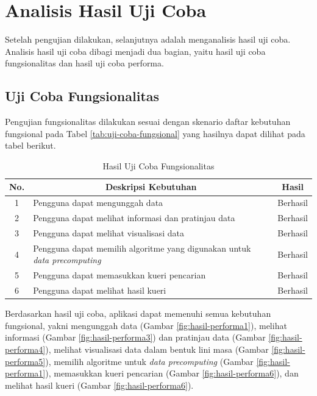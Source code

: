 \section{Analisis Hasil Uji Coba}
\tab Setelah pengujian dilakukan, selanjutnya adalah menganalisis hasil uji coba. Analisis hasil uji coba dibagi menjadi dua bagian, yaitu hasil uji coba fungsionalitas dan hasil uji coba performa.

\subsection{Uji Coba Fungsionalitas}
\tab Pengujian fungsionalitas dilakukan sesuai dengan skenario daftar kebutuhan fungsional pada Tabel \ref{tab:uji-coba-fungsional} yang hasilnya dapat dilihat pada tabel berikut. 

\begin{table}[H]
	\centering
	\begin{tabular}{ | c | p{5cm} | p{2cm} | }
		\hline
		\multicolumn{1}{|c}{\textbf{No.}} & \multicolumn{1}{|c}{\textbf{Deskripsi Kebutuhan}} & \multicolumn{1}{|c|}{\textbf{Hasil}}\\ \hline \hline
		1 & Pengguna dapat mengunggah data & Berhasil\\ \hline
		2 & Pengguna dapat melihat informasi dan pratinjau data & Berhasil\\ \hline
		3 & Pengguna dapat melihat visualisasi data & Berhasil \\ \hline
		4 & Pengguna dapat memilih algoritme yang digunakan untuk \textit{data precomputing} & Berhasil\\ \hline
		5 & Pengguna dapat memasukkan kueri pencarian & Berhasil \\ \hline
		6 & Pengguna dapat melihat hasil kueri & Berhasil\\ \hline
	\end{tabular} \caption{Hasil Uji Coba Fungsionalitas}
	\label{tab:hasil-uji-coba-fungsional}
\end{table}

\pagebreak
Berdasarkan hasil uji coba, aplikasi dapat memenuhi semua kebutuhan fungsional, yakni mengunggah data (Gambar \ref{fig:hasil-performa1}), melihat informasi (Gambar \ref{fig:hasil-performa3}) dan pratinjau data (Gambar \ref{fig:hasil-performa4}), melihat visualisasi data dalam bentuk lini masa (Gambar \ref{fig:hasil-performa5}), memilih algoritme untuk \textit{data precomputing} (Gambar \ref{fig:hasil-performa1}), memasukkan kueri pencarian (Gambar \ref{fig:hasil-performa6}), dan melihat hasil kueri (Gambar \ref{fig:hasil-performa6}).

